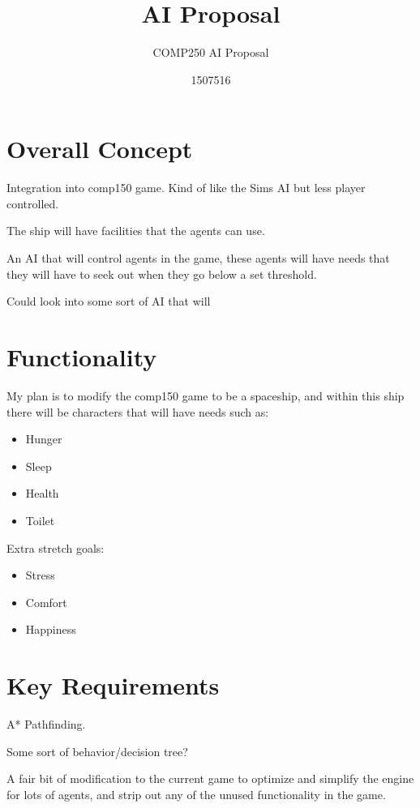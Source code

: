 \documentclass{scrartcl}
\title{AI Proposal}
\subtitle{COMP250 AI Proposal}
\author{1507516}
\begin{document}
\maketitle

\section{Overall Concept}
Integration into comp150 game.
Kind of like the Sims AI but less player controlled.

The ship will have facilities that the agents can use.

An AI that will control agents in the game, these agents will have needs that they will have to seek out when they go below a set threshold.

Could look into some sort of AI that will 


\section{Functionality}
My plan is to modify the comp150 game to be a spaceship, and within this ship there will be characters that will have needs such as:

\begin{itemize}
  \item Hunger
  \item Sleep
  \item Health
  \item Toilet
\end{itemize}

Extra stretch goals:
\begin{itemize}
	\item Stress
	\item Comfort
	\item Happiness
\end{itemize}

\section{Key Requirements}

A* Pathfinding.

Some sort of behavior/decision tree?

A fair bit of modification to the current game to optimize and simplify the engine for lots of agents, and strip out any of the unused functionality in the game.
\end{document}
